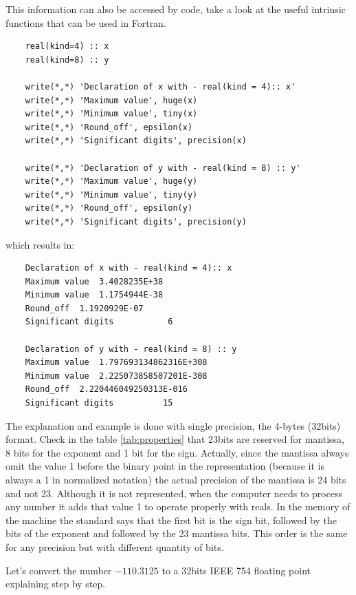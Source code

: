 This information can also be accessed by code, take a look at the useful intrinsic functions that can be used in Fortran.

\begin{verbatim}
    real(kind=4) :: x
    real(kind=8) :: y
    
    write(*,*) 'Declaration of x with - real(kind = 4):: x'
    write(*,*) 'Maximum value', huge(x)
    write(*,*) 'Minimum value', tiny(x)
    write(*,*) 'Round_off', epsilon(x)
    write(*,*) 'Significant digits', precision(x)
    
    write(*,*) 'Declaration of y with - real(kind = 8) :: y'
    write(*,*) 'Maximum value', huge(y)
    write(*,*) 'Minimum value', tiny(y)
    write(*,*) 'Round_off', epsilon(y)
    write(*,*) 'Significant digits', precision(y)
\end{verbatim}

which results in:

\begin{verbatim}
    Declaration of x with - real(kind = 4):: x
    Maximum value  3.4028235E+38
    Minimum value  1.1754944E-38
    Round_off  1.1920929E-07
    Significant digits           6
    
    Declaration of y with - real(kind = 8) :: y
    Maximum value  1.797693134862316E+308
    Minimum value  2.225073858507201E-308
    Round_off  2.220446049250313E-016
    Significant digits          15
\end{verbatim}









\FloatBarrier
The explanation and example is done with single precision, the 4-bytes (32bits) format. Check in the table \ref{tab:properties} that 23bits are reserved for mantissa, 8 bits for the exponent and 1 bit for the sign. Actually, since the mantissa always omit the value 1 before the binary point in the representation (because it is always a 1 in normalized notation) the actual precision of the mantissa is 24 bits and not 23. Although it is not represented, when the computer needs to process any number it adds that value 1 to operate properly with reals. In the memory of the machine the standard says that the first bit is the sign bit, followed by the bits of the exponent and followed by the 23 mantissa bits. This order is the same for any precision but with different quantity of bits. 

Let's convert the number $-110.3125$ to a 32bits IEEE 754 floating point explaining step by step.

